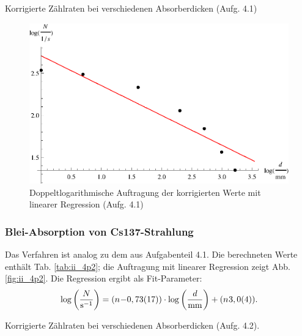 \begin{table}[tb]
	\centering
	\caption{Korrigierte Zählraten bei verschiedenen Absorberdicken (Aufg. 4.1)}
	\label{tab:ii_4p1}
	
\end{table}

\begin{figure}[tb]
	\centering
	\includegraphics[scale=1.0]{fig/ii_4p1.eps}
	\caption{Doppeltlogarithmische Auftragung der korrigierten Werte mit linearer Regression (Aufg. 4.1)}
	\label{fig:ii_4p1}
\end{figure}

\subsubsection{Blei-Absorption von Cs137-Strahlung}
Das Verfahren ist analog zu dem aus Aufgabenteil 4.1. Die berechneten Werte enthält Tab. \ref{tab:ii_4p2}; die Auftragung mit linearer Regression zeigt Abb. \ref{fig:ii_4p2}. Die Regression ergibt als Fit-Parameter:
\begin{equation}
\log\left(\frac{N}{\si{\per\second}}\right) = (\numb{-0,73(17)}) \cdot \log\left(\frac{d}{\si{mm}}\right) + (\numb{3,0(4)}).
\end{equation}

\begin{table}[tb]
	\centering
	\caption{Korrigierte Zählraten bei verschiedenen Absorberdicken (Aufg. 4.2).}
	\label{tab:ii_4p2}
	
\end{table}

